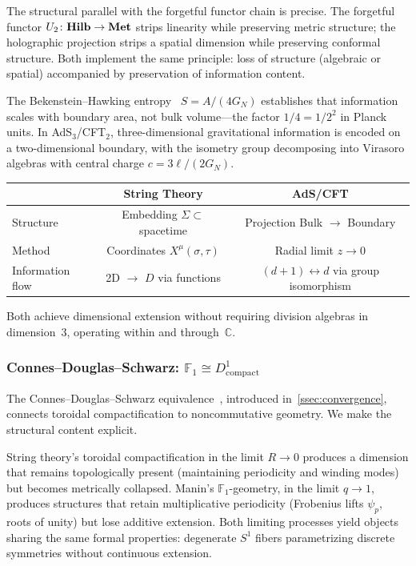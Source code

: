 The structural parallel with the forgetful functor chain is precise.
The forgetful functor $U_2\colon \mathbf{Hilb} \to \mathbf{Met}$ strips linearity
while preserving metric structure; the holographic projection strips
a spatial dimension while preserving conformal structure.  Both
implement the same principle: loss of structure (algebraic or
spatial) accompanied by preservation of information content.

The Bekenstein--Hawking entropy~\cite{bekenstein73,hawking75} $S = A/(4G_N)$ establishes that
information scales with boundary area, not bulk volume---the factor
$1/4 = 1/2^2$ in Planck units.  In AdS$_3$/CFT$_2$,
three-dimensional gravitational information is encoded on a
two-dimensional boundary, with the isometry group decomposing into
Virasoro algebras with central charge $c = 3\ell/(2G_N)$.

\begin{center}
\begin{tabular}{lcc}
\toprule
 & String Theory & AdS/CFT \\
\midrule
Structure & Embedding $\Sigma \subset$ spacetime
  & Projection Bulk $\to$ Boundary \\
Method & Coordinates $X^\mu(\sigma,\tau)$
  & Radial limit $z \to 0$ \\
Information flow & 2D $\to$ $D$ via functions
  & $(d{+}1) \leftrightarrow d$ via group isomorphism \\
\bottomrule
\end{tabular}
\end{center}

Both achieve dimensional extension without requiring division algebras
in dimension~3, operating within and through~$\mathbb{C}$.


\subsubsection{Connes--Douglas--Schwarz:
$\mathbb{F}_1 \cong D^1_{\mathrm{compact}}$}

The Connes--Douglas--Schwarz
equivalence~\cite{connes98}, introduced in~\cref{ssec:convergence}, connects toroidal
compactification to noncommutative geometry.  We make the structural
content explicit.

String theory's toroidal compactification in the limit $R \to 0$
produces a dimension that remains topologically present (maintaining
periodicity and winding modes) but becomes metrically collapsed.
Manin's $\mathbb{F}_1$-geometry, in the limit $q \to 1$, produces
structures that retain multiplicative periodicity (Frobenius lifts
$\psi_p$, roots of unity) but lose additive extension.  Both
limiting processes yield objects sharing the same formal properties:
degenerate $S^1$ fibers parametrizing discrete symmetries without
continuous extension.

